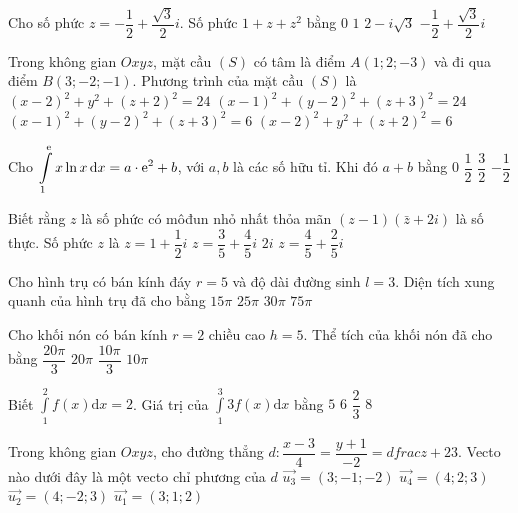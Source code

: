 \begin{ex}%
Cho số phức $z=-\dfrac{1}{2}+\dfrac{\sqrt{3}}{2} i$. Số phức $1+z+z^2$ bằng
\choice
{\True $0$}
{$1$}
{$2-i \sqrt{3}$}
{$-\dfrac{1}{2}+\dfrac{\sqrt{3}}{2} i$}

\end{ex}
\begin{ex}%
Trong không gian $O x y z$, mặt cầu $(S)$ có tâm là điểm $A(1; 2;-3)$ và đi qua điểm $B(3;-2;-1)$. Phương trình của mặt cầu $(S)$ là
\choice
{$(x-2)^2+y^2+(z+2)^2=24$}
{\True $(x-1)^2+(y-2)^2+(z+3)^2=24$}
{$(x-1)^2+(y-2)^2+(z+3)^2=6$}
{$(x-2)^2+y^2+(z+2)^2=6$}

\end{ex}
\begin{ex}%
Cho $\displaystyle\int\limits_1^{{\rm e}} x \ln x \mathrm{\,d} x=a \cdot {\rm e}^2+b$, với $a, b$ là các số hữu tỉ. Khi đó $a+b$ bằng
\choice
{$0$}
{\True $\dfrac{1}{2}$}
{$\dfrac{3}{2}$}
{$-\dfrac{1}{2}$}

\end{ex}
\begin{ex}%
Biết rằng $z$ là số phức có môđun nhỏ nhất thỏa mãn $(z-1)(\bar{z}+2 i)$ là số thực. Số phức $z$ là
\choice
{$z=1+\dfrac{1}{2} i$}
{$z=\dfrac{3}{5}+\dfrac{4}{5} i$}
{$2 i$}
{\True $z=\dfrac{4}{5}+\dfrac{2}{5} i$}

\end{ex}
\begin{ex}%
Cho hình trụ có bán kính đáy $r=5$ và độ dài đường sinh $l=3$. Diện tích xung quanh của hình trụ đã cho bằng
\choice
{$15\pi$}
{$25\pi$}
{\True $30\pi$}
{$75\pi$}

\end{ex}
\begin{ex}%
Cho khối nón có bán kính $r=2$ chiều cao $h=5$. Thể tích của khối nón đã cho bằng
\choice
{\True $\dfrac{20\pi}{3}$}
{$20\pi$}
{$\dfrac{10\pi}{3}$}
{$10\pi$}

\end{ex}
\begin{ex}%
Biết $\displaystyle\int\limits_1^2 f(x) \mathrm{d} x=2$. Giá trị của $\displaystyle\int\limits_1^3 3 f(x) \mathrm{d} x$ bằng
\choice
{$5$}
{\True $6$}
{$\dfrac{2}{3}$}
{$8$}

\end{ex}
\begin{ex}%
Trong không gian $O x y z$, cho đường thẳng $d\colon \dfrac{x-3}{4}=\dfrac{y+1}{-2}= dfrac{z+2}{3}$. Vecto nào dưới đây là một vecto chỉ phương của $d$ 
\choice
{$\overrightarrow{u_3}=(3;-1;-2)$}
{$\overrightarrow{u_4}=(4; 2; 3)$}
{\True $\overrightarrow{u_2}=(4;-2; 3)$}
{$\overrightarrow{u_1}=(3; 1; 2)$}

\end{ex}
